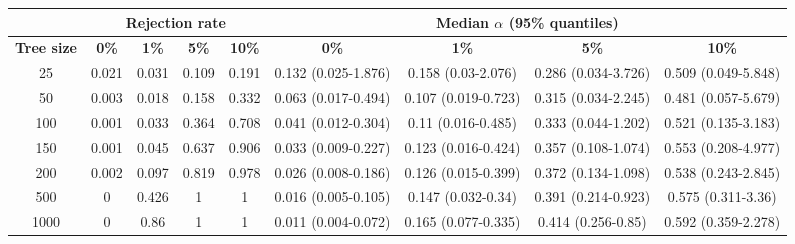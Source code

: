 \begin{tabular}{ccccccccc}
  \hline
  & \multicolumn{4}{c}{\textbf{Rejection rate}} & \multicolumn{4}{c}{\textbf{Median $\alpha$ (95\% quantiles)}} \\
  \hline
  \textbf{Tree size}    &    \textbf{0\%} & \textbf{1\%}  & \textbf{5\%}  &  \textbf{10\%}   &    \textbf{0\%} & \textbf{1\%}  & \textbf{5\%}  &  \textbf{10\%} \\
  \hline
25  & 0.021 & 0.031 & 0.109 & 0.191 & 0.132 (0.025-1.876) & 0.158 (0.03-2.076)  & 0.286 (0.034-3.726) & 0.509 (0.049-5.848) \\
50  & 0.003 & 0.018 & 0.158 & 0.332 & 0.063 (0.017-0.494) & 0.107 (0.019-0.723) & 0.315 (0.034-2.245) & 0.481 (0.057-5.679) \\
100 & 0.001 & 0.033 & 0.364 & 0.708 & 0.041 (0.012-0.304) & 0.11 (0.016-0.485)  & 0.333 (0.044-1.202) & 0.521 (0.135-3.183) \\
150 & 0.001 & 0.045 & 0.637 & 0.906 & 0.033 (0.009-0.227) & 0.123 (0.016-0.424) & 0.357 (0.108-1.074) & 0.553 (0.208-4.977) \\
200 & 0.002 & 0.097 & 0.819 & 0.978 & 0.026 (0.008-0.186) & 0.126 (0.015-0.399) & 0.372 (0.134-1.098) & 0.538 (0.243-2.845) \\
500 & 0 & 0.426 & 1 & 1 & 0.016 (0.005-0.105) & 0.147 (0.032-0.34)  & 0.391 (0.214-0.923) & 0.575 (0.311-3.36)  \\
1000  & 0 & 0.86  & 1 & 1 & 0.011 (0.004-0.072) & 0.165 (0.077-0.335) & 0.414 (0.256-0.85)  & 0.592 (0.359-2.278) \\
  \hline
\end{tabular}